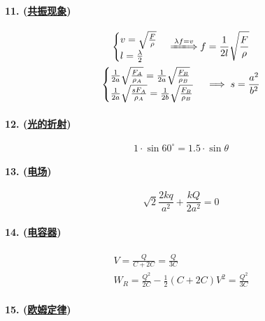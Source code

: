 \paragraph{11. (\hyperref[subsec:共振现象]{共振现象})}

\begin{gather*}
    \begin{cases}
        v=\sqrt{\frac{F}{\rho}}\\
        l=\frac{\lambda}{2}
    \end{cases}\xLongrightarrow{\lambda f=v}f=\frac{1}{2l}\sqrt{\frac{F}{\rho}}\\
    \begin{cases}
        \frac{1}{2a}\sqrt{\frac{F_A}{\rho_A}}=\frac{1}{2a}\sqrt{\frac{F_B}{\rho_B}}\\
        \frac{1}{2a}\sqrt{\frac{sF_A}{\rho_A}}=\frac{1}{2b}\sqrt{\frac{F_B}{\rho_B}}
    \end{cases}\implies s=\frac{a^2}{b^2}
\end{gather*}

\paragraph{12. (\hyperref[subsec:光的折射]{光的折射})}

\begin{equation*}
    1\cdot\sin60^\circ=1.5\cdot\sin\theta
\end{equation*}

\paragraph{13. (\hyperref[subsec:电场]{电场})}

\begin{equation*}
    \sqrt{2}\frac{2kq}{a^2}+\frac{kQ}{2a^2}=0
\end{equation*}

\paragraph{14. (\hyperref[subsec:电容器]{电容器})}

\begin{gather*}
    V=\frac{Q}{C+2C}=\frac{Q}{3C}\\
    W_R=\frac{Q^2}{2C}-\frac12(C+2C)V^2=\frac{Q^2}{3C}
\end{gather*}

\paragraph{15. (\hyperref[subsec:欧姆定律]{欧姆定律})}

